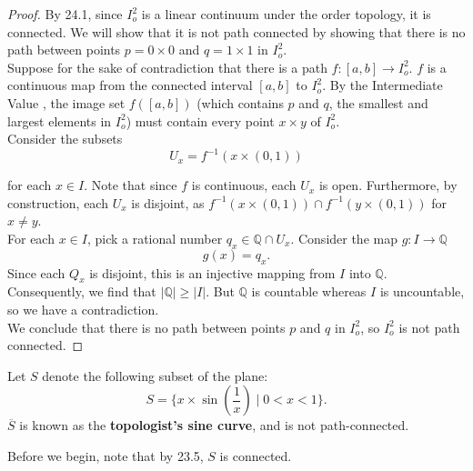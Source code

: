 \documentclass[11pt]{article}
\begin{document}
\begin{proof}
By  24.1, since $I_o^2$ is a linear continuum under the order topology, it is connected. We will show that it is not path connected by showing that there is no path between points $p = 0 \times 0$ and $q = 1 \times 1$ in $I_o^2$. \\

Suppose for the sake of contradiction that there is a path $f \colon [a, b] \rightarrow I_o^2$. $f$ is a continuous map from the connected interval $[a, b]$ to $I_o^2$. By the Intermediate Value , the image set $f([a, b])$ (which contains $p$ and $q$, the smallest and largest elements in $I_o^2$) must contain every point $x \times y$ of $I_o^2$. \\

Consider the subsets 
\[
    U_x = f^{-1}\left( x \times (0, 1) \right)
\]

for each $x \in I$. Note that since $f$ is continuous, each $U_x$ is open. Furthermore, by construction, each $U_x$ is disjoint, as $f^{-1}\left( x \times (0, 1) \right) \cap f^{-1}\left( y \times (0, 1) \right)$ for $x \neq y$. \\

For each $x \in I$, pick a rational number $q_x \in \mathbb{Q} \cap U_x$. Consider the map $g \colon I \rightarrow \mathbb{Q}$
\[
    g(x) = q_x.
\]
Since each $Q_x$ is disjoint, this is an injective mapping from $I$ into $\mathbb{Q}$. Consequently, we find that $|\mathbb{Q}| \geq |I|$. But $\mathbb{Q}$ is countable whereas $I$ is uncountable, so we have a contradiction.\\

We conclude that there is no path between points $p$ and $q$ in $I_o^2$, so $I_o^2$ is not path connected.\end{proof}

\begin{eg}
Let $S$ denote the following subset of the plane:
\[
    S = \{ x \times \sin \left( \frac{1}{x} \right) \mid 0 < x < 1\}. 
\]
$\overline{S}$ is known as the \textbf{topologist's sine curve}, and is not path-connected.
\end{eg}

Before we begin, note that by  23.5, $S$ is connected. \\
\end{document}
